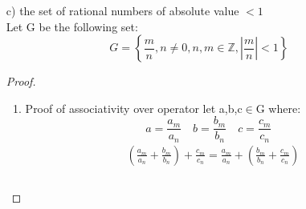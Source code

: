 \documentclass[11pt]{article}
\theoremstyle{definition}  %
\newcommand{\Z}{\mathbb{Z}}
\begin{document}
\begin{enumerate}
\begin{itemize}
\begin{proof}
\[      \]
      \begin{enumerate}
        \item Proof of associativity over operator
        let a,b,c$\in$G where:
        \[
          a=\frac{a_m}{a_n}\quad b=\frac{b_m}{b_n}\quad
          c=\frac{c_m}{c_n}
        \]
        \begin{align*}
          &\left(\frac{a_m}{a_n}+\frac{b_m}{b_n}\right)+\frac{c_m}{c_n}=\frac{a_m}{a_n}+\left(\frac{b_m}{b_n}+\frac{c_m}{c_n}\right)\\\\
          &\frac{a_mb_n+b_ma_n}{a_nb_n}+\frac{c_m}{c_n}=\frac{a_m}{a_n}+\left(\frac{b_mc_n+c_mb_n}{b_nc_n}\right)\\\\
          &\frac{c_n(a_mb_n+b_ma_n)+c_ma_nb_n}{a_nb_nc_n}=\frac{a_n(b_mc_n+c_mb_n)+a_mb_nc_n}{a_nb_nc_n}\right)\\\\
          &\frac{c_na_mb_n+c_nb_ma_n+c_ma_nb_n}{a_nb_nc_n}=\frac{c_na_mb_n+c_nb_ma_n+c_ma_nb_n}{a_nb_nc_n}\right)
        \end{align*}
        The denominator $a_nb_nc_n$ is the product of three even numbers which is also even preserving the construction of G.
        \item Proof of existence of identity element\\
        The Identity element for this set is the element: $\frac{0}{2}=0$
        \item  Proof of existence of inverse of operator\\  For all g$\in G$ the additive inverse is the element $-g$
      \end{enumerate}
    \end{proof}
    \item[c)] the set of rational numbers of absolute value $<1$
    \\
    Let G be the following set:
    \[
      G=\left\{\frac{m}{n},n\neq0,n,m\in \Z, |\frac{m}{n}|<1\right\}
    \]
    \begin{proof}\\
      \begin{enumerate}
        \item Proof of associativity over operator
        let a,b,c$\in$G where:
        \[
          a=\frac{a_m}{a_n}\quad b=\frac{b_m}{b_n}\quad
          c=\frac{c_m}{c_n}
        \]
        \begin{align*}
          &\left(\frac{a_m}{a_n}+\frac{b_m}{b_n}\right)+\frac{c_m}{c_n}=\frac{a_m}{a_n}+\left(\frac{b_m}{b_n}+\frac{c_m}{c_n}\right)\\\\

\end{align*}
\end{enumerate}
\end{proof}
\end{itemize}
\end{enumerate}
\end{document}
